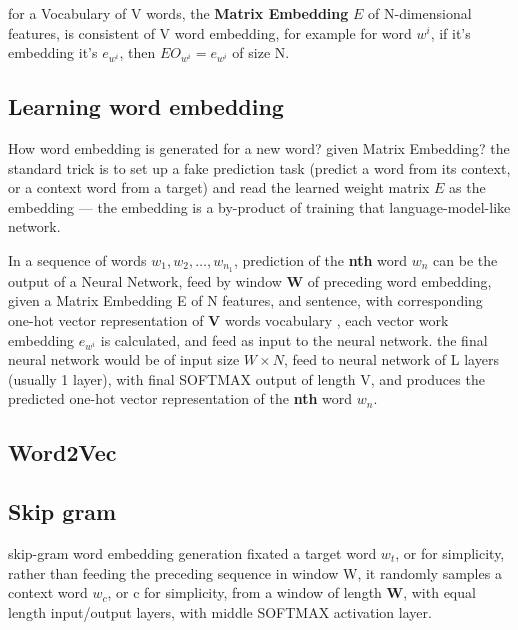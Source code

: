 \documentclass[4apaper,12pt]{book}
\begin{document}
\begin{description}
\begin{description}
\begin{description}
      \end{description}
      \item for a Vocabulary of V words, the \textbf{Matrix Embedding} $E$ of N-dimensional features, is consistent of V word embedding, for example for word $w^i$, if it's embedding it's $e_{w^i}$, then $EO_{w^i}=e_{w^i}$ of size N.
        \subsection{Learning word embedding}
        \begin{description}
        \item How word embedding is generated for a new word? given Matrix Embedding? the standard trick is to set up a fake prediction task (predict a word from its context, or a context word from a target) and read the learned weight matrix $E$ as the embedding --- the embedding is a by-product of training that language-model-like network.
        \item In a sequence of words $w_1,w_2,\dots,w_{n_1}$, prediction of the \textbf{nth} word $w_n$ can be the output of a Neural Network, feed by window \textbf{W} of preceding word embedding, given a Matrix Embedding E of N features, and sentence, with corresponding one-hot vector representation of \textbf{V} words vocabulary  , each vector work embedding $e_{w^i}$ is calculated, and feed as input to the neural network. the final neural network would be of input size $W\times{N}$, feed to neural network of L layers (usually 1 layer), with final SOFTMAX output of length V, and produces the predicted one-hot vector representation of the \textbf{nth} word $w_n$.
          \subsection{Word2Vec}
            \subsection{Skip gram}
            \begin{description}
            \item skip-gram word embedding generation fixated a target word $w_t$, or for simplicity, rather than feeding the preceding sequence in window W, it randomly samples a context word $w_c$, or c for simplicity, from a window of length \textbf{W}, with equal length input/output layers, with middle SOFTMAX activation layer.


\end{description}
\end{description}
\end{description}
\end{description}
\end{document}
